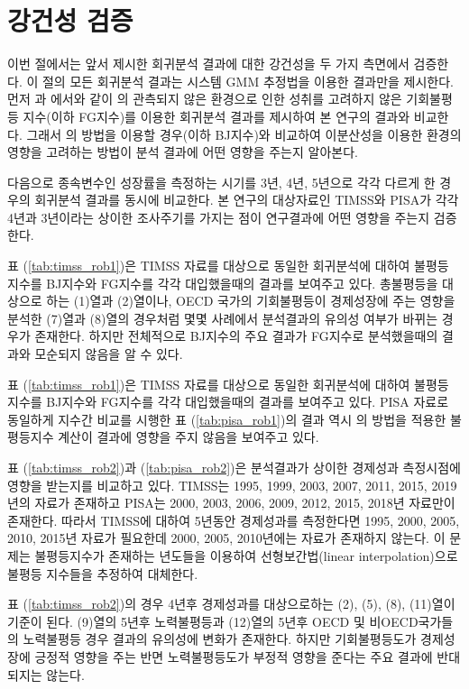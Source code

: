 \section{강건성 검증}

이번 절에서는 앞서 제시한 회귀분석 결과에 대한 강건성을 두 가지 측면에서 검증한다. 이 절의 모든 회귀분석 결과는 시스템 GMM 추정법을 이용한 결과만을 제시한다.
먼저 \cite{mnr13}과 \cite{kno17}에서와 같이 \cite{fng11}의 관측되지 않은 환경으로 인한 성취를 고려하지 않은 기회불평등 지수(이하 FG지수)를 이용한 회귀분석 결과를 제시하여 본 연구의 결과와 비교한다.
그래서 \cite{betl12}의 방법을 이용할 경우(이하 BJ지수)와 비교하여 이분산성을 이용한 환경의 영향을 고려하는 방법이 분석 결과에 어떤 영향을 주는지 알아본다.

다음으로 종속변수인 성장률을 측정하는 시기를 3년, 4년, 5년으로 각각 다르게 한 경우의 회귀분석 결과를 동시에 비교한다.
본 연구의 대상자료인 TIMSS와 PISA가 각각 4년과 3년이라는 상이한 조사주기를 가지는 점이 연구결과에 어떤 영향을 주는지 검증한다.

표 (\ref{tab:timss_rob1})은 TIMSS 자료를 대상으로 동일한 회귀분석에 대하여 불평등 지수를 BJ지수와 FG지수를 각각 대입했을때의 결과를 보여주고 있다.
총불평등을 대상으로 하는 (1)열과 (2)열이나, OECD 국가의 기회불평등이 경제성장에 주는 영향을 분석한 (7)열과 (8)열의 경우처럼 몇몇 사례에서 분석결과의 유의성 여부가 바뀌는 경우가 존재한다.
하지만 전체적으로 BJ지수의 주요 결과가 FG지수로 분석했을때의 결과와 모순되지 않음을 알 수 있다.  



표 (\ref{tab:timss_rob1})은 TIMSS 자료를 대상으로 동일한 회귀분석에 대하여 불평등 지수를 BJ지수와 FG지수를 각각 대입했을때의 결과를 보여주고 있다.
PISA 자료로 동일하게 지수간 비교를 시행한 표 (\ref{tab:pisa_rob1})의 결과 역시 \cite{betl12}의 방법을 적용한 불평등지수 계산이 결과에 영향을 주지 않음을 보여주고 있다.



표 (\ref{tab:timss_rob2})과 (\ref{tab:pisa_rob2})은 분석결과가 상이한 경제성과 측정시점에 영향을 받는지를 비교하고 있다.
TIMSS는 1995, 1999, 2003, 2007, 2011, 2015, 2019년의 자료가 존재하고 PISA는 2000, 2003, 2006, 2009, 2012, 2015, 2018년 자료만이 존재한다.
따라서 TIMSS에 대하여 5년동안 경제성과를 측정한다면 1995, 2000, 2005, 2010, 2015년 자료가 필요한데 2000, 2005, 2010년에는 자료가 존재하지 않는다.
이 문제는 불평등지수가 존재하는 년도들을 이용하여 선형보간법(linear interpolation)으로 불평등 지수들을 추정하여 대체한다.
 
표 (\ref{tab:timss_rob2})의 경우 4년후 경제성과를 대상으로하는 (2), (5), (8), (11)열이 기준이 된다.
(9)열의 5년후 노력불평등과 (12)열의 5년후 OECD 및 비OECD국가들의 노력불평등 경우 결과의 유의성에 변화가 존재한다. 하지만 기회불평등도가 경제성장에 긍정적 영향을 주는 반면 노력불평등도가 부정적 영향을 준다는 주요 결과에 반대되지는 않는다.

